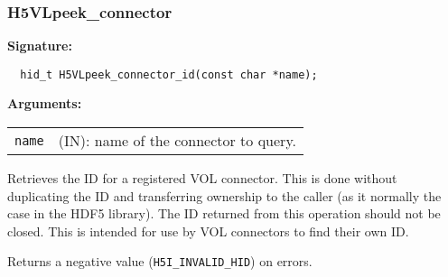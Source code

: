\subsubsection{H5VLpeek\_connector}
\begin{mdframed}[style=bgbox]
\textbf{Signature:}
\begin{lstlisting}
  hid_t H5VLpeek_connector_id(const char *name); 
\end{lstlisting}

\textbf{Arguments:}\\
\begin{tabular}{l p{13.5cm}}
 {\tt name} & (IN): name of the connector to query.\\
\end{tabular}
\end{mdframed}
Retrieves the ID for a registered VOL connector. This is done without duplicating
the ID and transferring ownership to the caller (as it normally the case in the
HDF5 library). The ID returned from this operation should not be closed.
This is intended for use by VOL connectors to find their own ID.

Returns a negative value ({\tt H5I\_INVALID\_HID}) on errors.\bigskip


